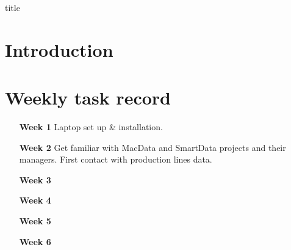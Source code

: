 \documentclass[12pt]{book}
\begin{document}
{title}

\tableofcontents


\chapter{Introduction}


\appendix
\chapter{Weekly task record}
\begin{itemize}
    \item [\textbf{Week 1}] Laptop set up \& installation.
    \item [\textbf{Week 2}] Get familiar with MacData and SmartData projects and their managers. First contact with production lines data.
    \item [\textbf{Week 3}]                                                  
    \item [\textbf{Week 4}]                                                  
    \item [\textbf{Week 5}]                                                  
    \item [\textbf{Week 6}]                                                  
\end{itemize}


\end{document}

